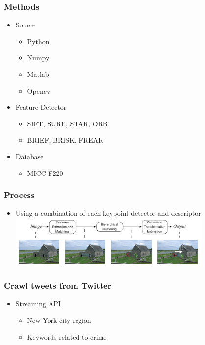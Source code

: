 \documentclass{beamer}
\begin{document}
    \begin{frame}
        \frametitle{Methods}
        \begin{itemize} [<+->]
            \item Source
                \begin{itemize}
                    \item Python
                    \item Numpy
                    \item Matlab
                    \item Opencv
                \end{itemize}
            \item Feature Detector
                \begin{itemize}
                    \item SIFT, SURF, STAR, ORB
                    \item BRIEF, BRISK, FREAK
                \end{itemize}
             \item Database
                \begin{itemize}
                    \item MICC-F220
                \end{itemize}

        \end{itemize}
    \end{frame}

    \begin{frame}
        \frametitle{Process}
        \begin{itemize}[<+->]
            \item Using a combination of each keypoint detector and descriptor
            \includegraphics[width=10cm]{process}
        \end{itemize}
    \end{frame}

    \begin{frame}
        \frametitle{Crawl tweets from Twitter}
        \begin{itemize}
            \item Streaming API
                \begin{itemize}
                    \item New York city region
                    \item Keywords related to crime
                \end{itemize}
        \end{itemize}
    \end{frame}
\end{document}
